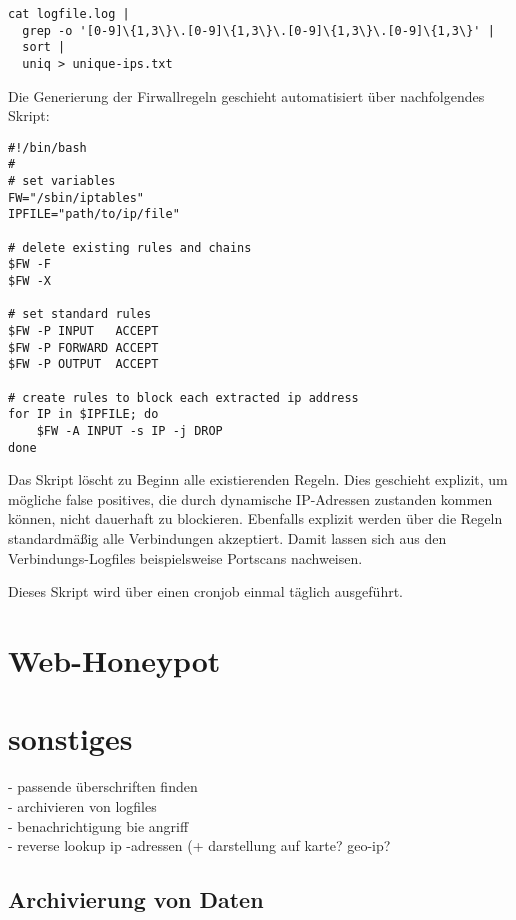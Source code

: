 \begin{lstlisting}[style=customc]
cat logfile.log | 
  grep -o '[0-9]\{1,3\}\.[0-9]\{1,3\}\.[0-9]\{1,3\}\.[0-9]\{1,3\}' |
  sort |
  uniq > unique-ips.txt
\end{lstlisting}

Die Generierung der Firwallregeln geschieht automatisiert über nachfolgendes Skript:

\begin{lstlisting}[style=customc]
#!/bin/bash
#
# set variables
FW="/sbin/iptables"
IPFILE="path/to/ip/file"

# delete existing rules and chains
$FW -F
$FW -X

# set standard rules
$FW -P INPUT   ACCEPT
$FW -P FORWARD ACCEPT
$FW -P OUTPUT  ACCEPT

# create rules to block each extracted ip address
for IP in $IPFILE; do
    $FW -A INPUT -s IP -j DROP
done

\end{lstlisting}

Das Skript löscht zu Beginn alle existierenden Regeln. Dies geschieht explizit, um mögliche false positives, die durch dynamische IP-Adressen zustanden kommen können, nicht dauerhaft zu blockieren. Ebenfalls explizit werden über die Regeln standardmäßig alle Verbindungen akzeptiert. Damit lassen sich aus den Verbindungs-Logfiles beispielsweise Portscans nachweisen.

Dieses Skript wird über einen cronjob einmal täglich ausgeführt.


\section{Web-Honeypot}
\label{sec:Web-Honeypot}


\section{sonstiges}
\label{sec:sonstiges}

- passende überschriften finden\\
- archivieren von logfiles\\
- benachrichtigung bie angriff\\
- reverse lookup ip -adressen (+ darstellung auf karte? geo-ip?\\

\subsection{Archivierung von Daten}
\label{subsec:Archivierung von Daten}

